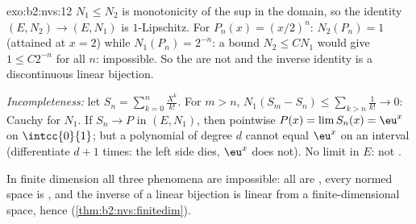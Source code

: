 \begin{solution}{exo:b2:nvs:12}
$N_1 \leq N_2$ is monotonicity of the sup in the domain, so the
identity $(E, N_2) \to (E, N_1)$ is $1$-Lipschitz. For $P_n(x) =
(x/2)^n$: $N_2(P_n) = 1$ (attained at $x = 2$) while $N_1(P_n) =
2^{-n}$: a bound $N_2 \leq CN_1$ would give $1 \leq C2^{-n}$ for
all $n$: impossible. So the  are not  and the
inverse identity is a discontinuous linear bijection.

\emph{Incompleteness:} let $S_n = \sum_{k=0}^{n}\frac{X^k}{k!}$.
For $m > n$, $N_1(S_m - S_n) \leq \sum_{k>n}\frac1{k!} \to 0$:
Cauchy for $N_1$. If $S_n \to P$ in $(E, N_1)$, then pointwise
$P(x) = \lim S_n(x) = \eu^x$ on $\intcc{0}{1}$; but a polynomial
of degree $d$ cannot equal $\eu^x$ on an interval (differentiate
$d + 1$ times: the left side dies, $\eu^x$ does not). No limit in
$E$: not .

In finite dimension all three phenomena are impossible: all 
are , every normed space is , and the inverse
of a linear bijection is linear from a finite-dimensional space,
hence  (\cref{thm:b2:nvs:finitedim}).
\end{solution}

